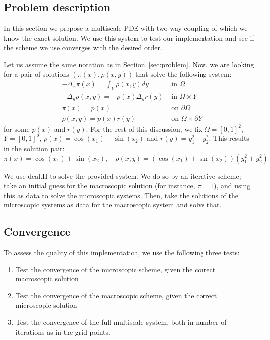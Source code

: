 \documentclass{article}
\begin{document}
\subsection{Problem description}
\label{sub:problem_description}

\label{sec:manufactured}
In this section we propose a multiscale PDE with two-way coupling of which we know the exact solution. We use this system to test our implementation and see if the scheme we use converges with the desired order.

Let us assume the same notation as in Section~\ref{sec:problem}.
Now, we are looking for a pair of solutions $(\pi(x),\rho(x,y))$ that solve the following system:
\begin{align}
    \label{eq:man_ellip}&-\Delta_x \pi(x) = \int_Y \rho(x,y) dy &\mbox{ in } \Omega\\
    \label{eq:man_para}&- \Delta_y \rho(x,y) = -p(x)\Delta_y r(y) &\mbox{ in }  \Omega\times Y \\
    \label{eq:man_ell_bc}&\pi(x) = p(x)  &\mbox{ on } \partial \Omega \\
    \label{eq:man_para_bc}&\rho(x,y) = p(x)r(y) &\mbox{ on } \Omega \times \partial Y
\end{align}
for some $p(x)$ and $r(y)$.
For the rest of this discussion, we fix $\Omega = [0,1]^2$, $Y = [0,1]^2$, $p(x) = \cos(x_1) + \sin(x_2)$ and $r(y) = y_1^2 + y_2^2$.
This results in the solution pair:
\begin{equation}
    \pi(x) =  \cos(x_1) + \sin(x_2),\quad \rho(x,y) = \left( \cos(x_1) + \sin(x_2) \right) \left(  y_1^2 + y_2^2 \right)
\end{equation}

We use deal.II to solve the provided system. We do so by an iterative scheme; take an initial guess for the macroscopic solution (for instance, $\pi=1$), and using this as data to solve the microscopic systems. Then, take the solutions of the microscopic systems as data for the macroscopic system and solve that.

\subsection{Convergence}
To assess the quality of this implementation, we use the following three tests:
\begin{enumerate}
    \item Test the convergence of the microscopic scheme, given the correct macroscopic solution
    \item Test the convergence of the macroscopic scheme, given the correct microscopic solution
    \item Test the convergence of the full multiscale system, both in number of iterations as in the grid points.
\end{enumerate}
\end{document}
